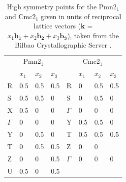 \begin{table}[h!]
\centering
\label{symm_points}
\begin{tabular}{llll|llll}
\toprule[1.2pt]
\multicolumn{4}{c}{Pmn2$_1$}     & \multicolumn{4}{c}{Cmc2$_1$}     \\
         & $x_1$ & $x_2$ & $x_3$ &          & $x_1$ & $x_2$ & $x_3$\\  \midrule[1pt]
R        & 0.5   & 0.5   & 0.5   & R        & 0     & 0.5   & 0.5   \\
S        & 0.5   & 0.5   & 0     & S        & 0     & 0.5   & 0     \\
X        & 0.5   & 0     & 0     & $\Gamma$ & 0     & 0     & 0     \\
$\Gamma$ & 0     & 0     & 0     & Y        & 0.5   & 0.5   & 0     \\
Y        & 0     & 0.5   & 0     & T        & 0.5   & 0.5   & 0.5   \\
T        & 0     & 0.5   & 0.5   & Z        & 0     & 0     &       \\
Z        & 0     & 0     & 0.5   & $\Gamma$   & 0     & 0     & 0     \\
U        & 0.5   & 0     & 0.5   &          &       &       &      
\\ \bottomrule[1.2pt]
\end{tabular}
\caption{High symmetry points for the Pmn2$_1$ and Cmc2$_1$ given in units of reciprocal lattice vectors (\textbf{k} = $x_1\mathbf{b_1} + x_2\mathbf{b_2} + x_3\mathbf{b_3}$), taken from the Bilbao Crystallographic Server \cite{Bilbao, Bilbao2}.}
\end{table}